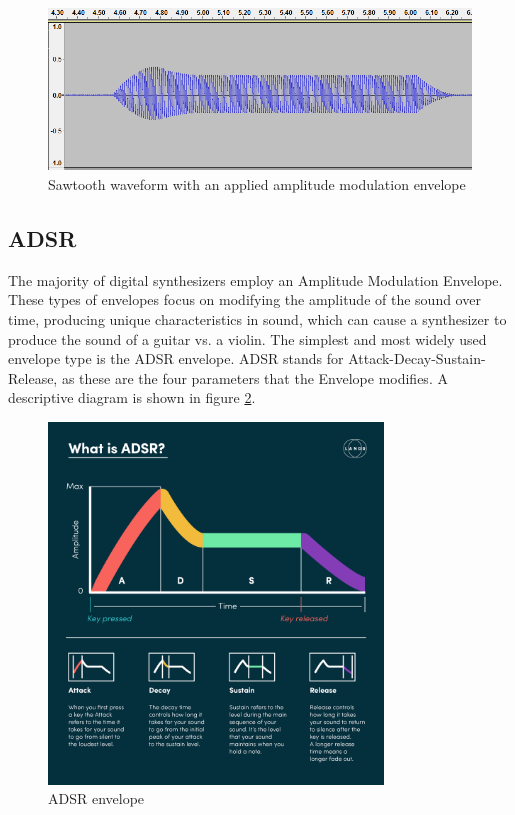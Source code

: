 \documentclass[a4paper,12pt]{report}
\begin{document}
\begin{figure}
    \centering
    \includegraphics[width=36em]{ADSRWaveform.png}
    \caption{Sawtooth waveform with an applied amplitude modulation envelope}
    \label{fig:ADSRWaveform}
\end{figure}

\subsection{ADSR}
\label{subsec:adsr}
The majority of digital synthesizers employ an Amplitude Modulation Envelope. These types of envelopes focus on modifying the amplitude of the sound over time, producing unique characteristics in sound, which can cause a synthesizer to produce the sound of a guitar vs. a violin. The simplest and most widely used envelope type is the ADSR envelope. ADSR stands for Attack-Decay-Sustain-Release, as these are the four parameters that the Envelope modifies. A descriptive diagram is shown in figure \ref{fig:ADSRExplained}.

\begin{figure}
    \centering
    \includegraphics[width=24em]{ADSRExplained.jpg}
    \caption{ADSR envelope}
    \label{fig:ADSRExplained}
\end{figure}
\end{document}
